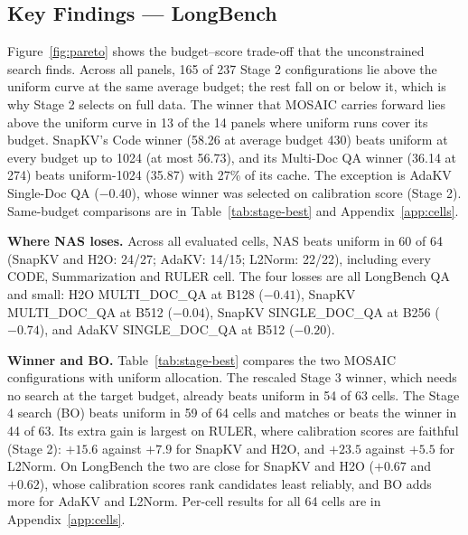 \documentclass[11pt]{article}
\begin{document}
\subsection{Key Findings — LongBench}
\label{sec:which-stage}

Figure~\ref{fig:pareto} shows the budget--score trade-off that the unconstrained search finds. Across all panels, 165 of 237 Stage 2 configurations lie above the uniform curve at the same average budget; the rest fall on or below it, which is why Stage 2 selects on full data. The winner that MOSAIC carries forward lies above the uniform curve in 13 of the 14 panels where uniform runs cover its budget. SnapKV's Code winner (58.26 at average budget 430) beats uniform at every budget up to 1024 (at most 56.73), and its Multi-Doc QA winner (36.14 at 274) beats uniform-1024 (35.87) with 27\% of its cache. The exception is AdaKV Single-Doc QA ($-0.40$), whose winner was selected on calibration score (Stage 2). Same-budget comparisons are in Table~\ref{tab:stage-best} and Appendix~\ref{app:cells}.

\textbf{Where NAS loses.} Across all evaluated cells, NAS beats uniform in 60 of 64 (SnapKV and H2O: 24/27; AdaKV: 14/15; L2Norm: 22/22), including every CODE, Summarization and RULER cell. The four losses are all LongBench QA and small: H2O MULTI\_DOC\_QA at B128 ($-0.41$), SnapKV MULTI\_DOC\_QA at B512 ($-0.04$), SnapKV SINGLE\_DOC\_QA at B256 ($-0.74$), and AdaKV SINGLE\_DOC\_QA at B512 ($-0.20$).

\textbf{Winner and BO.} Table~\ref{tab:stage-best} compares the two MOSAIC configurations with uniform allocation. The rescaled Stage 3 winner, which needs no search at the target budget, already beats uniform in 54 of 63 cells. The Stage 4 search (BO) beats uniform in 59 of 64 cells and matches or beats the winner in 44 of 63. Its extra gain is largest on RULER, where calibration scores are faithful (Stage 2): $+15.6$ against $+7.9$ for SnapKV and H2O, and $+23.5$ against $+5.5$ for L2Norm. On LongBench the two are close for SnapKV and H2O ($+0.67$ and $+0.62$), whose calibration scores rank candidates least reliably, and BO adds more for AdaKV and L2Norm. Per-cell results for all 64 cells are in Appendix~\ref{app:cells}.
\end{document}
